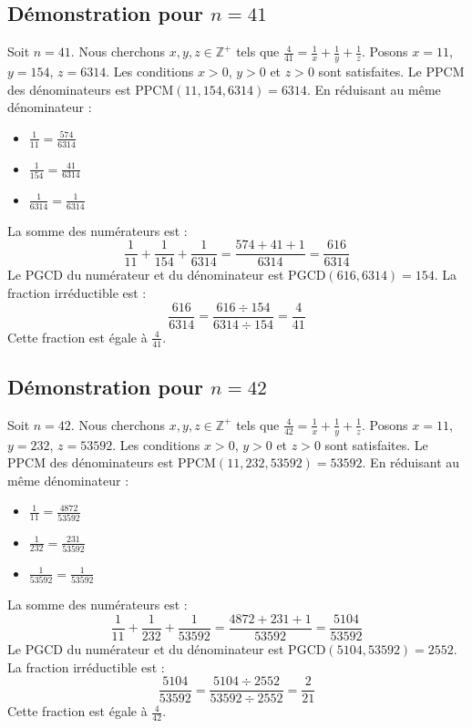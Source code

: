\documentclass[11pt,a4paper]{article}
\begin{document}
\subsection{Démonstration pour $n = 41$}
Soit $n = 41$. Nous cherchons $x, y, z \in \mathbb{Z}^{+}$ tels que $\frac{4}{41} = \frac{1}{x} + \frac{1}{y} + \frac{1}{z}$.
Posons $x = 11$, $y = 154$, $z = 6314$.
Les conditions $x > 0$, $y > 0$ et $z > 0$ sont satisfaites.
Le PPCM des dénominateurs est $\text{PPCM}(11, 154, 6314) = 6314$.
En réduisant au même dénominateur :
\begin{itemize}
    \item $\frac{1}{11} = \frac{574}{6314}$
    \item $\frac{1}{154} = \frac{41}{6314}$
    \item $\frac{1}{6314} = \frac{1}{6314}$
\end{itemize}
La somme des numérateurs est :
$$ \frac{1}{11} + \frac{1}{154} + \frac{1}{6314} = \frac{574 + 41 + 1}{6314} = \frac{616}{6314} $$
Le PGCD du numérateur et du dénominateur est $\text{PGCD}(616, 6314) = 154$.
La fraction irréductible est :
$$ \frac{616}{6314} = \frac{616 \div 154}{6314 \div 154} = \frac{4}{41} $$
Cette fraction est égale à $\frac{4}{41}$.

\subsection{Démonstration pour $n = 42$}
Soit $n = 42$. Nous cherchons $x, y, z \in \mathbb{Z}^{+}$ tels que $\frac{4}{42} = \frac{1}{x} + \frac{1}{y} + \frac{1}{z}$.
Posons $x = 11$, $y = 232$, $z = 53592$.
Les conditions $x > 0$, $y > 0$ et $z > 0$ sont satisfaites.
Le PPCM des dénominateurs est $\text{PPCM}(11, 232, 53592) = 53592$.
En réduisant au même dénominateur :
\begin{itemize}
    \item $\frac{1}{11} = \frac{4872}{53592}$
    \item $\frac{1}{232} = \frac{231}{53592}$
    \item $\frac{1}{53592} = \frac{1}{53592}$
\end{itemize}
La somme des numérateurs est :
$$ \frac{1}{11} + \frac{1}{232} + \frac{1}{53592} = \frac{4872 + 231 + 1}{53592} = \frac{5104}{53592} $$
Le PGCD du numérateur et du dénominateur est $\text{PGCD}(5104, 53592) = 2552$.
La fraction irréductible est :
$$ \frac{5104}{53592} = \frac{5104 \div 2552}{53592 \div 2552} = \frac{2}{21} $$
Cette fraction est égale à $\frac{4}{42}$.
\end{document}
